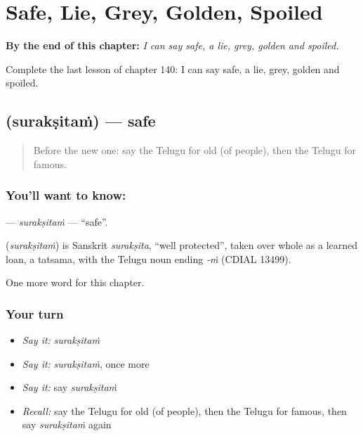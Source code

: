 
\chapter{Safe, Lie, Grey, Golden, Spoiled}
\label{ch:te-safe-lie-grey-golden-spoiled}

\begin{chapteropening}
\textbf{By the end of this chapter:} \emph{I can say safe, a lie, grey, golden and spoiled.}

Complete the last lesson of chapter 140: I can say safe, a lie, grey, golden and spoiled.
\end{chapteropening}

\section[\texorpdfstring{\te{సురక్షితం} (surakṣitaṁ)}{సురక్షితం (surakṣitaṁ)}]{ (surakṣitaṁ) — safe}

\label{lesson:TE-C140-suraksitam}



\begin{quote}
Before the new one: say the Telugu for old (of people), then the Telugu for famous.
\end{quote}

\subsection*{You'll want to know: }
\textbf{} — \emph{surakṣitaṁ} — \textquotedblleft{}safe\textquotedblright{}.

\begin{cousinweb}
\textbf{} (\emph{surakṣitaṁ}) is Sanskrit \emph{surakṣita}, \textquotedblleft{}well protected\textquotedblright{}, taken over whole as a learned loan, a tatsama, with the Telugu noun ending \emph{-ṁ} (CDIAL 13499).
\end{cousinweb}

\begin{grammarlens}[title={What you've built}]
One more word for this chapter.
\end{grammarlens}

\subsection*{Your turn}
\begin{itemize}
\raggedright
  \item \emph{Say it:} \emph{surakṣitaṁ}
  \item \emph{Say it:} \emph{surakṣitaṁ}, once more
  \item \emph{Say it:} say \emph{surakṣitaṁ}
  \item \emph{Recall:} say the Telugu for old (of people), then the Telugu for famous, then say \emph{surakṣitaṁ} again
\end{itemize}

